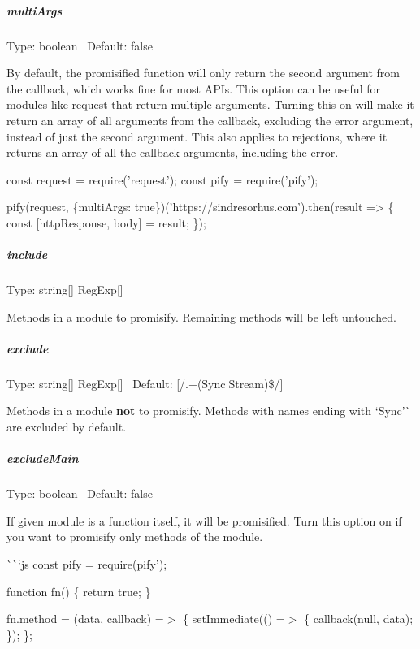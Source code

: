 \subparagraph*{multi\+Args}

Type\+: {\ttfamily boolean}~\newline
 Default\+: {\ttfamily false}

By default, the promisified function will only return the second argument from the callback, which works fine for most A\+P\+Is. This option can be useful for modules like {\ttfamily request} that return multiple arguments. Turning this on will make it return an array of all arguments from the callback, excluding the error argument, instead of just the second argument. This also applies to rejections, where it returns an array of all the callback arguments, including the error.


\begin{DoxyCode}
const request = require('request');
const pify = require('pify');

pify(request, \{multiArgs: true\})('https://sindresorhus.com').then(result => \{
  const [httpResponse, body] = result;
\});
\end{DoxyCode}


\subparagraph*{include}

Type\+: {\ttfamily string\mbox{[}\mbox{]}} {\ttfamily Reg\+Exp\mbox{[}\mbox{]}}

Methods in a module to promisify. Remaining methods will be left untouched.

\subparagraph*{exclude}

Type\+: {\ttfamily string\mbox{[}\mbox{]}} {\ttfamily Reg\+Exp\mbox{[}\mbox{]}}~\newline
 Default\+: {\ttfamily \mbox{[}/.+(Sync$\vert$\+Stream)\$/\mbox{]}}

Methods in a module {\bfseries not} to promisify. Methods with names ending with `\textquotesingle{}Sync'\`{} are excluded by default.

\subparagraph*{exclude\+Main}

Type\+: {\ttfamily boolean}~\newline
 Default\+: {\ttfamily false}

If given module is a function itself, it will be promisified. Turn this option on if you want to promisify only methods of the module.

\`{}\`{}`js const pify = require(\textquotesingle{}pify');

function fn() \{ return true; \}

fn.\+method = (data, callback) =$>$ \{ set\+Immediate(() =$>$ \{ callback(null, data); \}); \};

